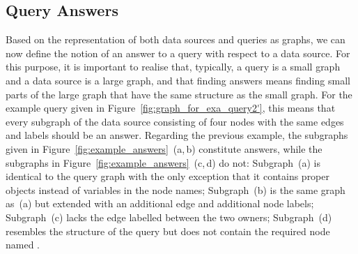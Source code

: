 \subsection{Query Answers}

Based on the representation of both data sources and queries as graphs,
we can now define the notion of an answer to a query 
with respect to a data source. For this purpose, it is important to realise
that, typically, a query is a small graph and a data source is a large graph,
and that finding answers means finding small parts of the large graph
that have the same structure as the small graph.
For the example query given in Figure~\ref{fig:graph_for_exa_query2'},
this means that every subgraph of the data source consisting of four nodes
with the same edges and labels should be an answer.
Regarding the previous example, the subgraphs given in
Figure~\ref{fig:example_answers}~(a,\,b) constitute answers,
while the subgraphs in Figure~\ref{fig:example_answers}~(c,\,d) do not:
Subgraph~(a) is identical to the query graph with the only exception that it
contains proper objects instead of variables in the node names;
Subgraph~(b) is the same graph as~(a) but extended with an additional edge and additional node labels;
Subgraph~(c) lacks the edge labelled  between the two owners;
Subgraph~(d) resembles the structure of the query but does not contain
the required node named .

